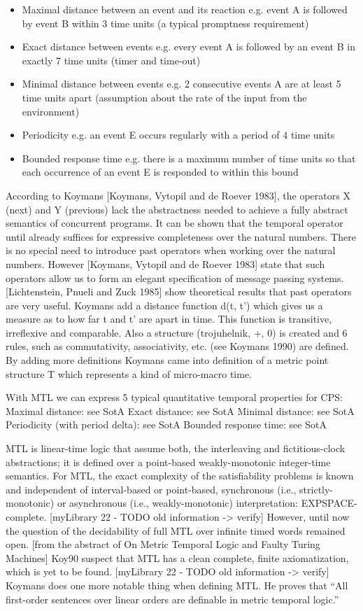 \begin{itemize}
	\item Maximal distance between an event and its reaction e.g. event A is followed by event B within 3 time units (a typical promptness requirement)
	\item Exact distance between events e.g. every event A is followed by an event B in exactly 7 time units (timer and time-out)
	\item Minimal distance between events e.g. 2 consecutive events A are at least 5 time units apart (assumption about the rate of the input from the environment)
	\item Periodicity e.g. an event E occurs regularly with a period of 4 time units
	\item Bounded response time e.g. there is a maximum number of time units so that each occurrence of an event E is responded to within this bound
\end{itemize}

According to Koymans [Koymans, Vytopil and de Roever 1983], the operators X (next) and Y (previous) lack the abstractness needed to achieve a fully abstract semantics of concurrent programs. It can be shown that the temporal operator until already suffices for expressive completeness over the natural numbers. There is no special need to introduce past operators when working over the natural numbers. However [Koymans, Vytopil and de Roever 1983] state that such operators allow us to form an elegant specification of message passing systems. [Lichtenstein, Pnueli and Zuck 1985] show theoretical results that past operators are very useful. Koymans add a distance function d(t, t’) which gives us a measure as to how far t and t’ are apart in time. This function is transitive, irreflexive and comparable. Also a structure (trojuhelnik, +, 0) is created and 6 rules, such as commutativity, associativity, etc. (see Koymans 1990) are defined. By adding more definitions Koymans came into definition of a metric point structure T which represents a kind of micro-macro time. 

With MTL we can express 5 typical quantitative temporal properties for CPS:
Maximal distance: see SotA
Exact distance: see SotA
Minimal distance: see SotA
Periodicity (with period delta): see SotA
Bounded response time: see SotA

MTL is linear-time logic that assume both, the interleaving and fictitious-clock abstractions; it is defined over a point-based weakly-monotonic integer-time semantics. For MTL, the exact complexity of the satisfiability problems is known and independent of interval-based or point-based, synchronous (i.e., strictly-monotonic) or asynchronous (i.e., weakly-monotonic) interpretation: EXPSPACE-complete. [myLibrary 22 - TODO old information -> verify] However, until now the question of the decidability of full MTL over infinite timed words remained open. [from the abstract of On Metric Temporal Logic and Faulty Turing Machines] Koy90 suspect that MTL has a clean complete, finite axiomatization, which is yet to be found. [myLibrary 22 - TODO old information -> verify] Koymans does one more notable thing when defining MTL. He proves that “All first-order sentences over linear orders are definable in metric temporal logic.”

